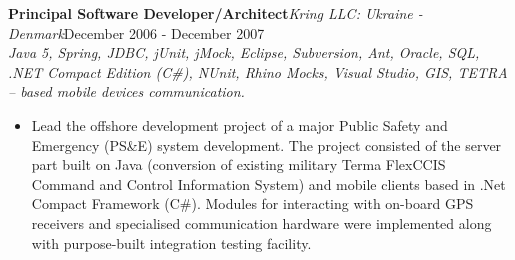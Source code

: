 \documentclass{res}
\newcommand{\jobdes}[4]{\needspace{3\baselineskip}%
{\noindent \bf #3\hspace{2ex}}{{\em \small #1}}{\hfill #2}\\{{\it \small #4.}}}
\begin{document}
\begin{resume}
\jobdes {Kring LLC: Ukraine - Denmark}{December 2006 - December 2007}{Principal Software Developer/Architect}
{Java 5, Spring, JDBC, jUnit, jMock, Eclipse, Subversion, Ant, Oracle, SQL, .NET Compact Edition (C\#), NUnit, Rhino Mocks, Visual Studio, GIS, TETRA – based mobile devices communication}
\begin{itemize} \itemsep -2pt %
 \item Lead the offshore development project of a major Public Safety and Emergency (PS\&E) system development. The project consisted of the server part built on Java (conversion of existing military Terma FlexCCIS Command and Control Information System) and mobile clients based in .Net Compact Framework (C\#). Modules for interacting with on-board GPS receivers and specialised communication hardware were implemented along with purpose-built integration testing facility.
\end{itemize}


\end{resume}
\end{document}
